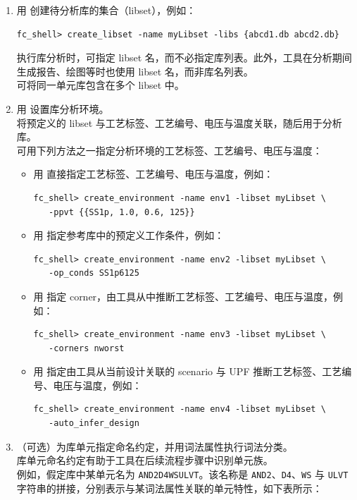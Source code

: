 \begin{enumerate}
  \item 用  创建待分析库的集合（libset），例如：
\begin{lstlisting}
fc_shell> create_libset -name myLibset -libs {abcd1.db abcd2.db}
\end{lstlisting}
    执行库分析时，可指定 libset 名，而不必指定库列表。此外，工具在分析期间生成报告、绘图等时也使用 libset 名，而非库名列表。\\
    可将同一单元库包含在多个 libset 中。

  \item 用  设置库分析环境。\\
     将预定义的 libset 与工艺标签、工艺编号、电压与温度关联，随后用于分析库。\\
    可用下列方法之一指定分析环境的工艺标签、工艺编号、电压与温度：
    \begin{itemize}
      \item 用  直接指定工艺标签、工艺编号、电压与温度，例如：
\begin{lstlisting}
fc_shell> create_environment -name env1 -libset myLibset \
   -ppvt {{SS1p, 1.0, 0.6, 125}}
\end{lstlisting}
      \item 用  指定参考库中的预定义工作条件，例如：
\begin{lstlisting}
fc_shell> create_environment -name env2 -libset myLibset \
   -op_conds SS1p6125
\end{lstlisting}
      \item 用  指定 corner，由工具从中推断工艺标签、工艺编号、电压与温度，例如：
\begin{lstlisting}
fc_shell> create_environment -name env3 -libset myLibset \
   -corners nworst
\end{lstlisting}
      \item 用 \opt{-auto\_infer\_design} 指定由工具从当前设计关联的 scenario 与 UPF 推断工艺标签、工艺编号、电压与温度，例如：
\begin{lstlisting}
fc_shell> create_environment -name env4 -libset myLibset \
   -auto_infer_design
\end{lstlisting}
    \end{itemize}

  \item （可选）为库单元指定命名约定，并用词法属性执行词法分类。\\
    库单元命名约定有助于工具在后续流程步骤中识别单元族。\\
    例如，假定库中某单元名为 \texttt{AND2D4WSULVT}。该名称是 \texttt{AND2}、\texttt{D4}、\texttt{WS} 与 \texttt{ULVT} 字符串的拼接，分别表示与某词法属性关联的单元特性，如下表所示：


\end{enumerate}
